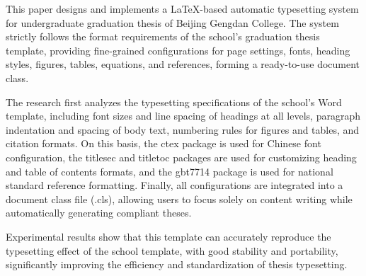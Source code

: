 This paper designs and implements a LaTeX-based automatic typesetting system for undergraduate graduation thesis of Beijing Gengdan College. The system strictly follows the format requirements of the school's graduation thesis template, providing fine-grained configurations for page settings, fonts, heading styles, figures, tables, equations, and references, forming a ready-to-use document class.

The research first analyzes the typesetting specifications of the school's Word template, including font sizes and line spacing of headings at all levels, paragraph indentation and spacing of body text, numbering rules for figures and tables, and citation formats. On this basis, the ctex package is used for Chinese font configuration, the titlesec and titletoc packages are used for customizing heading and table of contents formats, and the gbt7714 package is used for national standard reference formatting. Finally, all configurations are integrated into a document class file (.cls), allowing users to focus solely on content writing while automatically generating compliant theses.

Experimental results show that this template can accurately reproduce the typesetting effect of the school template, with good stability and portability, significantly improving the efficiency and standardization of thesis typesetting.

